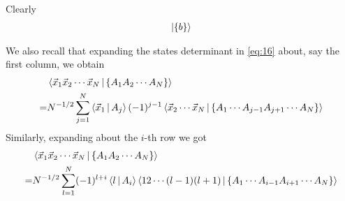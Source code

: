 \documentclass{book}
\renewcommand{\braket}[1]{\Braket{#1}}
\renewcommand{\ket}[1]{\Ket{#1}}
\begin{document}
Clearly
\begin{align}
    \ket{\{b\}}
\end{align}

We also recall that expanding the states determinant in \eqref{eq:16} about, say the first column, we obtain 
\begin{align}
    &\braket{\vec{x}_1\vec{x}_2\cdots\vec{x}_N|\{A_1A_2\cdots A_N\}}\notag\\
    =&N^{-1/2}\sum_{j=1}^N\braket{\vec{x}_1|A_j}(-1)^{j-1}\braket{\vec{x}_2\cdots\vec{x}_N|\{A_1\cdots A_{j-1}A_{j+1}\cdots A_N\}}
\end{align} 
Similarly, expanding about the $i$-th row we got
\begin{align}
    &\braket{\vec{x}_1\vec{x}_2\cdots\vec{x}_N|\{A_1A_2\cdots A_N\}}\notag\\
    =&N^{-1/2}\sum_{l=1}^N (-1)^{l+i}\braket{l|A_i} \braket{12\cdots(l-1)(l+1)|\{A_1\cdots A_{i-1}A_{i+1}\cdots A_N\}}
\end{align}







\end{document}
